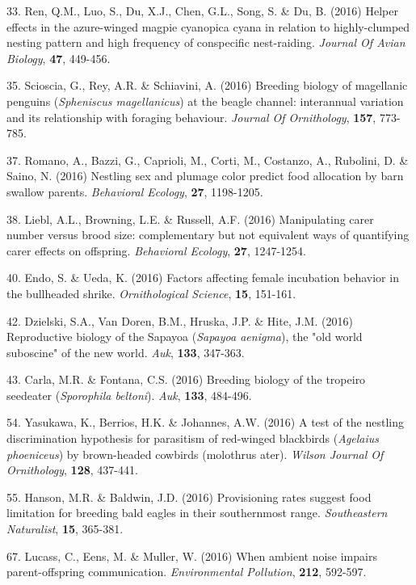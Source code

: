 33. Ren, Q.M., Luo, S., Du, X.J., Chen, G.L., Song, S. \&  Du, B. (2016) Helper effects in the azure-winged magpie cyanopica cyana in relation to highly-clumped nesting pattern and high frequency of conspecific nest-raiding. \textit{Journal Of Avian Biology},  \textbf{47}, 449-456.

35. Scioscia, G., Rey, A.R. \&  Schiavini, A. (2016) Breeding biology of magellanic penguins (\textit{Spheniscus magellanicus}) at the beagle channel: interannual variation and its relationship with foraging behaviour. \textit{Journal Of Ornithology},  \textbf{157}, 773-785.

37. Romano, A., Bazzi, G., Caprioli, M., Corti, M., Costanzo, A., Rubolini, D. \&  Saino, N. (2016) Nestling sex and plumage color predict food allocation by barn swallow parents. \textit{Behavioral Ecology},  \textbf{27}, 1198-1205.

38. Liebl, A.L., Browning, L.E. \&  Russell, A.F. (2016) Manipulating carer number versus brood size: complementary but not equivalent ways of quantifying carer effects on offspring. \textit{Behavioral Ecology},  \textbf{27}, 1247-1254.

40. Endo, S. \&  Ueda, K. (2016) Factors affecting female incubation behavior in the bullheaded shrike. \textit{Ornithological Science},  \textbf{15}, 151-161.

42. Dzielski, S.A., Van Doren, B.M., Hruska, J.P. \&  Hite, J.M. (2016) Reproductive biology of the Sapayoa (\textit{Sapayoa aenigma}), the "old world suboscine" of the new world. \textit{Auk},  \textbf{133}, 347-363.

43. Carla, M.R. \&  Fontana, C.S. (2016) Breeding biology of the tropeiro seedeater (\textit{Sporophila beltoni}). \textit{Auk},  \textbf{133}, 484-496.

54. Yasukawa, K., Berrios, H.K. \&  Johannes, A.W. (2016) A test of the nestling discrimination hypothesis for parasitism of red-winged blackbirds (\textit{Agelaius phoeniceus}) by brown-headed cowbirds (molothrus ater). \textit{Wilson Journal Of Ornithology},  \textbf{128}, 437-441.

55. Hanson, M.R. \&  Baldwin, J.D. (2016) Provisioning rates suggest food limitation for breeding bald eagles in their southernmost range. \textit{Southeastern Naturalist},  \textbf{15}, 365-381.

67. Lucass, C., Eens, M. \&  Muller, W. (2016) When ambient noise impairs parent-offspring communication. \textit{Environmental Pollution},  \textbf{212}, 592-597.

